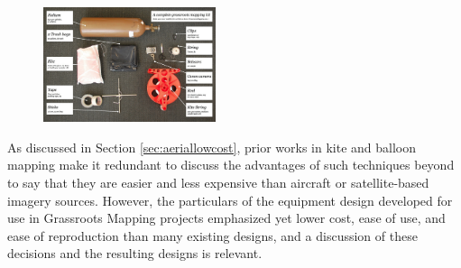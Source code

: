 \documentclass[11pt,oneside,notitlepage]{report}
\begin{document}
\begin{figure}
	\begin{flushright}
		\includegraphics[width=0.45\textwidth]{images/100-dollar-satellite-poster.jpg}
	\end{flushright}
\end{figure}

As discussed in Section \ref{sec:aeriallowcost}, prior works in kite and balloon mapping make it redundant to discuss the advantages of such techniques beyond to say that they are easier and less expensive than aircraft or satellite-based imagery sources. However, the particulars of the equipment design developed for use in Grassroots Mapping projects emphasized yet lower cost, ease of use, and ease of reproduction than many existing designs, and a discussion of these decisions and the resulting designs is relevant. 
\end{document}
